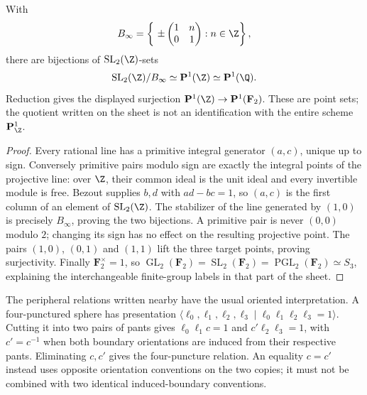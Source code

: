 \begin{proposition}\label{A6-projective-line}
With
\[
 B_\infty=\left\{\ \pm\begin{pmatrix}1&n\\0&1\end{pmatrix}
                    :n\in\Z\right\},
\]
there are bijections of $\operatorname{SL}_2(\Z)$-sets
\[
 \operatorname{SL}_2(\Z)/B_\infty
 \simeq\mathbf P^1(\Z)\simeq\mathbf P^1(\Q).
\]
Reduction gives the displayed surjection
$\mathbf P^1(\Z)\to\mathbf P^1(\mathbf F_2)$.
These are point sets; the quotient written on the sheet is not an identification with the entire scheme $\mathbf P^1_{\Z}$.
\end{proposition}
\begin{proof}
Every rational line has a primitive integral generator $(a,c)$, unique up to sign. Conversely primitive pairs modulo sign are exactly the integral points of the projective line: over $\Z$, their common ideal is the unit ideal and every invertible module is free. Bezout supplies $b,d$ with $ad-bc=1$, so $(a,c)$ is the first column of an element of $\operatorname{SL}_2(\Z)$. The stabilizer of the line generated by $(1,0)$ is precisely $B_\infty$, proving the two bijections. A primitive pair is never $(0,0)$ modulo $2$; changing its sign has no effect on the resulting projective point. The pairs $(1,0)$, $(0,1)$ and $(1,1)$ lift the three target points, proving surjectivity. Finally $\mathbf F_2^\times=1$, so $\operatorname{GL}_2(\mathbf F_2)=\operatorname{SL}_2(\mathbf F_2)=\operatorname{PGL}_2(\mathbf F_2)\simeq S_3$, explaining the interchangeable finite-group labels in that part of the sheet.
\end{proof}

The peripheral relations written nearby have the usual oriented interpretation. A four-punctured sphere has presentation
$\langle\ell_0,\ell_1,\ell_2,\ell_3\mid
\ell_0\ell_1\ell_2\ell_3=1\rangle$.
Cutting it into two pairs of pants gives
$\ell_0\ell_1c=1$ and $c'\ell_2\ell_3=1$, with $c'=c^{-1}$ when both boundary orientations are induced from their respective pants. Eliminating $c,c'$ gives the four-puncture relation. An equality $c=c'$ instead uses opposite orientation conventions on the two copies; it must not be combined with two identical induced-boundary conventions.

